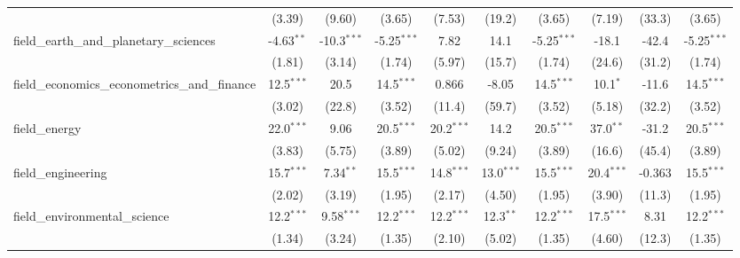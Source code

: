 \begin{tabular}{lccccccccc}
                                                               & (3.39)        & (9.60)         & (3.65)        & (7.53)        & (19.2)        & (3.65)        & (7.19)        & (33.3)         & (3.65)\\   
   field\_earth\_and\_planetary\_sciences                      & -4.63$^{**}$  & -10.3$^{***}$  & -5.25$^{***}$ & 7.82          & 14.1          & -5.25$^{***}$ & -18.1         & -42.4          & -5.25$^{***}$\\   
                                                               & (1.81)        & (3.14)         & (1.74)        & (5.97)        & (15.7)        & (1.74)        & (24.6)        & (31.2)         & (1.74)\\   
   field\_economics\_econometrics\_and\_finance                & 12.5$^{***}$  & 20.5           & 14.5$^{***}$  & 0.866         & -8.05         & 14.5$^{***}$  & 10.1$^{*}$    & -11.6          & 14.5$^{***}$\\   
                                                               & (3.02)        & (22.8)         & (3.52)        & (11.4)        & (59.7)        & (3.52)        & (5.18)        & (32.2)         & (3.52)\\   
   field\_energy                                               & 22.0$^{***}$  & 9.06           & 20.5$^{***}$  & 20.2$^{***}$  & 14.2          & 20.5$^{***}$  & 37.0$^{**}$   & -31.2          & 20.5$^{***}$\\   
                                                               & (3.83)        & (5.75)         & (3.89)        & (5.02)        & (9.24)        & (3.89)        & (16.6)        & (45.4)         & (3.89)\\   
   field\_engineering                                          & 15.7$^{***}$  & 7.34$^{**}$    & 15.5$^{***}$  & 14.8$^{***}$  & 13.0$^{***}$  & 15.5$^{***}$  & 20.4$^{***}$  & -0.363         & 15.5$^{***}$\\   
                                                               & (2.02)        & (3.19)         & (1.95)        & (2.17)        & (4.50)        & (1.95)        & (3.90)        & (11.3)         & (1.95)\\   
   field\_environmental\_science                               & 12.2$^{***}$  & 9.58$^{***}$   & 12.2$^{***}$  & 12.2$^{***}$  & 12.3$^{**}$   & 12.2$^{***}$  & 17.5$^{***}$  & 8.31           & 12.2$^{***}$\\   
                                                               & (1.34)        & (3.24)         & (1.35)        & (2.10)        & (5.02)        & (1.35)        & (4.60)        & (12.3)         & (1.35)\\   

\end{tabular}
